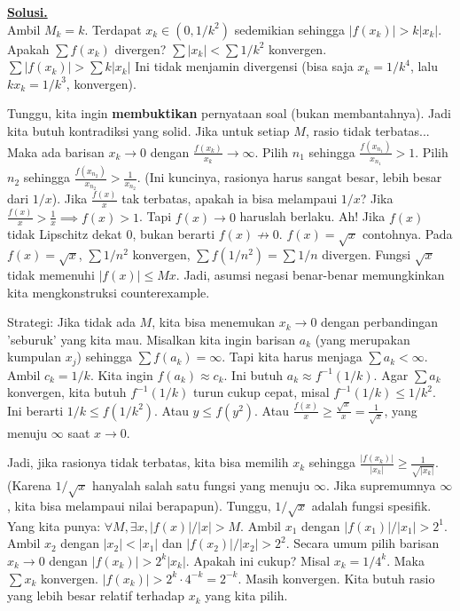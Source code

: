 \documentclass[12pt,twoside]{article}
\newenvironment{solution}
{
	\par\noindent\textbf{\underline{Solusi.}}\\
}
{
	\par
}
\begin{document}
\begin{enumerate}
\begin{solution}
          Ambil $M_k = k$. Terdapat $x_k \in (0, 1/k^2)$ sedemikian sehingga $|f(x_k)| > k |x_k|$.
          Apakah $\sum f(x_k)$ divergen?
          $\sum |x_k| < \sum 1/k^2$ konvergen.
          $\sum |f(x_k)| > \sum k |x_k|$
          Ini tidak menjamin divergensi (bisa saja $x_k = 1/k^4$, lalu $k x_k = 1/k^3$, konvergen).

          Tunggu, kita ingin \textbf{membuktikan} pernyataan soal (bukan membantahnya). Jadi kita butuh kontradiksi yang solid.
          Jika untuk setiap $M$, rasio tidak terbatas...
          Maka ada barisan $x_k \to 0$ dengan $\frac{f(x_k)}{x_k} \to \infty$.
          Pilih $n_1$ sehingga $\frac{f(x_{n_1})}{x_{n_1}} > 1$.
          Pilih $n_2$ sehingga $\frac{f(x_{n_2})}{x_{n_2}} > \frac{1}{x_{n_2}}$. (Ini kuncinya, rasionya harus sangat besar, lebih besar dari $1/x$).
          Jika $\frac{f(x)}{x}$ tak terbatas, apakah ia bisa melampaui $1/x$?
          Jika $\frac{f(x)}{x} > \frac{1}{x} \implies f(x) > 1$.
          Tapi $f(x) \to 0$ haruslah berlaku.
          Ah! Jika $f(x)$ tidak Lipschitz dekat 0, bukan berarti $f(x) \not\to 0$. $f(x) = \sqrt{x}$ contohnya.
          Pada $f(x)=\sqrt{x}$, $\sum 1/n^2$ konvergen, $\sum f(1/n^2) = \sum 1/n$ divergen.
          Fungsi $\sqrt{x}$ tidak memenuhi $|f(x)| \le Mx$.
          Jadi, asumsi negasi benar-benar memungkinkan kita mengkonstruksi counterexample.

          Strategi:
          Jika tidak ada $M$, kita bisa menemukan $x_k \to 0$ dengan perbandingan 'seburuk' yang kita mau.
          Misalkan kita ingin barisan $a_k$ (yang merupakan kumpulan $x_j$) sehingga $\sum f(a_k) = \infty$.
          Tapi kita harus menjaga $\sum a_k < \infty$.
          Ambil $c_k = 1/k$. Kita ingin $f(a_k) \approx c_k$.
          Ini butuh $a_k \approx f^{-1}(1/k)$.
          Agar $\sum a_k$ konvergen, kita butuh $f^{-1}(1/k)$ turun cukup cepat, misal $f^{-1}(1/k) \le 1/k^2$.
          Ini berarti $1/k \le f(1/k^2)$. Atau $y \le f(y^2)$.
          Atau $\frac{f(x)}{x} \ge \frac{\sqrt{x}}{x} = \frac{1}{\sqrt{x}}$, yang menuju $\infty$ saat $x \to 0$.

          Jadi, jika rasionya tidak terbatas, kita bisa memilih $x_k$ sehingga $\frac{|f(x_k)|}{|x_k|} \ge \frac{1}{\sqrt{|x_k|}}$.
          (Karena $1/\sqrt{x}$ hanyalah salah satu fungsi yang menuju $\infty$. Jika supremumnya $\infty$, kita bisa melampaui nilai berapapun).
          Tunggu, $1/\sqrt{x}$ adalah fungsi spesifik.
          Yang kita punya: $\forall M, \exists x, |f(x)|/|x| > M$.
          Ambil $x_1$ dengan $|f(x_1)|/|x_1| > 2^1$.
          Ambil $x_2$ dengan $|x_2| < |x_1|$ dan $|f(x_2)|/|x_2| > 2^2$.
          Secara umum pilih barisan $x_k \to 0$ dengan $|f(x_k)| > 2^k |x_k|$.
          Apakah ini cukup?
          Misal $x_k = 1/4^k$. Maka $\sum x_k$ konvergen.
          $|f(x_k)| > 2^k \cdot 4^{-k} = 2^{-k}$. Masih konvergen.
          Kita butuh rasio yang lebih besar relatif terhadap $x_k$ yang kita pilih.


\end{solution}
\end{enumerate}
\end{document}
